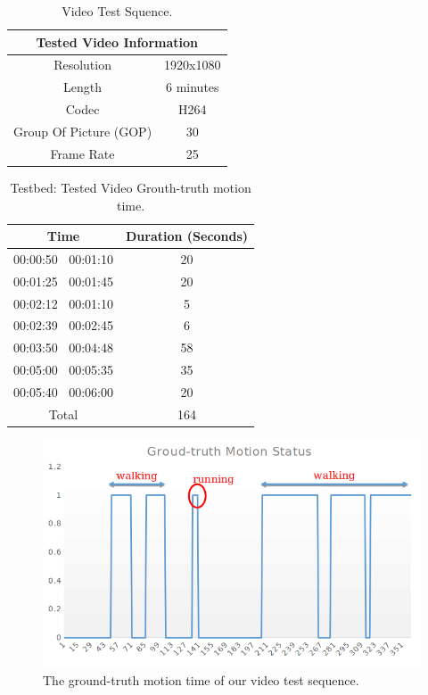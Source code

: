 \begin{table}[]
\centering
\caption{Video Test Squence.}
\label{tab:videotest}
\begin{tabular}{|c|c|}
\hline
\multicolumn{2}{|c|}{\textbf{Tested Video Information}} \\ \hline
Resolution                        & 1920x1080           \\ \hline
Length                            & 6 minutes           \\ \hline
Codec                             & H264                \\ \hline
Group Of Picture (GOP)            & 30                  \\ \hline
Frame Rate                        & 25                  \\ \hline
\end{tabular}
\end{table}
\begin{table}[]
\centering
\caption{Testbed: Tested Video Grouth-truth motion time.}
\label{tab:motiontime}
\begin{tabular}{|c|c|}
\hline
\textbf{Time}       & \textbf{Duration (Seconds)} \\ \hline
00:00:50 $~$ 00:01:10 & 20                          \\ \hline
00:01:25 $~$ 00:01:45 & 20                          \\ \hline
00:02:12 $~$ 00:01:10 & 5                           \\ \hline
00:02:39 $~$ 00:02:45 & 6                           \\ \hline
00:03:50 $~$ 00:04:48 & 58                          \\ \hline
00:05:00 $~$ 00:05:35 & 35                          \\ \hline
00:05:40 $~$ 00:06:00 & 20                          \\ \hline
Total               & 164                         \\ \hline
\end{tabular}
\end{table}
\begin{figure}
\centering
 \includegraphics[scale=0.4]{Figures/ground-truth.png}
 \caption{The ground-truth motion time of our video test sequence.}
 \label{fig:ground}
\end{figure}
